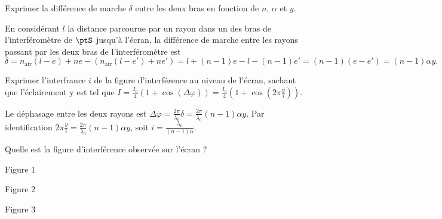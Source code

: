 \begin{enonce}
Exprimer la différence de marche $\delta$ entre les deux bras en fonction de $n$, $\alpha$ et $y$. 
\end{enonce}


\begin{corrige}
	En considérant $l$ la distance parcourue par un rayon dans un des bras de l'interféromètre de $\ptS$ jusqu'à l'écran, la différence de marche entre les rayons passant par les deux bras de l'interféromètre est
	$$
	\delta = n_{\text{air}}\left( l - e \right) + ne - \left( n_{\text{air}}\left( l - e' \right) + ne' \right) = l + \left( n - 1 \right)e -  l - \left( n - 1 \right)e'  = \left( n - 1 \right)\left( e - e' \right)  = \left( n - 1 \right)\alpha y.
	$$
\end{corrige}




\begin{enonce}
Exprimer l'interfrance $i$ de la figure d'interférence au niveau de l'écran, sachant que l'éclairement y est tel que $I = \frac{I_0}{4}\left( 1 + \cos\left(  \Delta \varphi \right) \right) = \frac{I_0}{4}\left( 1 + \cos\left(  2\pi\frac{y}{i} \right) \right)$.
\end{enonce}


\begin{corrige}
Le déphasage entre les deux rayons est $
\Delta \varphi = \frac{2\pi}{\lambda_0}\delta = \frac{2\pi}{\lambda_0}\left( n - 1 \right)\alpha y
$.
Par identification $2\pi\frac{y}{i} = \frac{2\pi}{\lambda_0}\left( n - 1 \right)\alpha y$, soit $i = \frac{\lambda_0}{\left( n-1 \right)\alpha}$.
\end{corrige}




\begin{enonce}
	Quelle est la figure d'interférence observée sur l'écran ?
	\begin{listeQCM3Colonnes}
		\item Figure 1
		\item Figure 2
		\item Figure 3
		\end{listeQCM3Colonnes}
\end{enonce}
	
